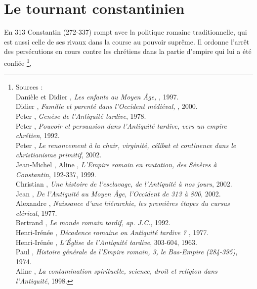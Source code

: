 

\chapter{Le tournant constantinien}


En 313  Constantin (272-337) rompt avec la politique romaine traditionnelle, qui est aussi celle de ses rivaux dans la course au pouvoir suprême. Il ordonne l'arrêt des persécutions en cours contre les chrétiens dans la partie d'empire qui lui a été confiée \footnote{Sources :
\\Danièle  et Didier , \emph{Les enfants au Moyen Âge, }, 1997.
\\Didier {}, \emph{Famille et parenté dans l'Occident médiéval, }, 2000.
\\Peter {}, \emph{Genèse de l'Antiquité tardive}, 1978.
\\Peter {}, \emph{Pouvoir et persuasion dans l'Antiquité tardive, vers un empire chrétien}, 1992.
\\Peter {}, \emph{Le renoncement à la chair, virginité, célibat et continence dans le christianisme primitif}, 2002.
\\Jean-Michel , Aline , \emph{L'Empire romain en mutation, des Sévères à Constantin}, 192-337, 1999.
\\Christian {}, \emph{Une histoire de l'esclavage, de l'Antiquité à nos jours}, 2002.
\\Jean {}, \emph{De l'Antiquité au Moyen Âge, l'Occident de 313 à 800}, 2002.
\\Alexandre {}, \emph{Naissance d'une hiérarchie, les premières étapes du cursus clérical}, 1977.
\\Bertrand {}, \emph{Le monde romain tardif,  ap. J.C.}, 1992.
\\Henri-Irénée , \emph{Décadence romaine ou Antiquité tardive ? }, 1977.
\\Henri-Irénée , \emph{L'Église de l'Antiquité tardive}, 303-604, 1963.
\\Paul {}, \emph{Histoire générale de l'Empire romain, 3, le Bas-Empire (284-395)}, 1974.
\\Aline {}, \emph{La contamination spirituelle, science, droit et religion dans l'Antiquité}, 1998.},
